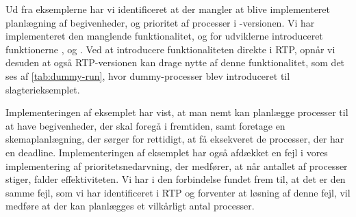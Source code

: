 Ud fra eksemplerne har vi identificeret at der mangler at blive implementeret  planlægning af begivenheder, og prioritet af processer i -versionen. Vi har implementeret den manglende funktionalitet, og for udviklerne introduceret funktionerne ,   og . Ved at introducere funktionaliteten direkte i RTP, opnår vi desuden at også RTP-versionen kan drage nytte af denne funktionalitet, som det ses af \cref{tab:dummy-run}, hvor dummy-processer blev introduceret til slagterieksemplet.

Implementeringen af eksemplet har vist, at man nemt kan planlægge processer til at have begivenheder, der skal foregå i fremtiden, samt foretage en skemaplanlægning, der sørger for  rettidigt, at få eksekveret de processer, der har en deadline. Implementeringen af eksemplet har også afdækket en fejl i vores implementering af prioritetsnedarvning, der medfører, at når antallet af processer stiger, falder effektiviteten. Vi har i den forbindelse fundet frem til, at det er den samme fejl, som vi har identificeret i RTP og forventer at løsning af denne fejl, vil medføre at der kan planlægges et vilkårligt antal processer.
